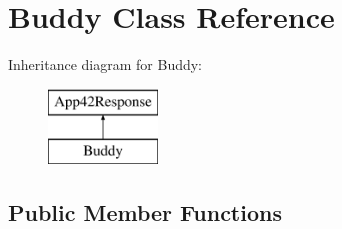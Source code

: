 \hypertarget{class_buddy}{\section{Buddy Class Reference}
\label{class_buddy}
}
Inheritance diagram for Buddy\+:\begin{figure}[H]
\begin{center}
\leavevmode
\includegraphics[height=2.000000cm]{class_buddy}
\end{center}
\end{figure}
\subsection*{Public Member Functions}
